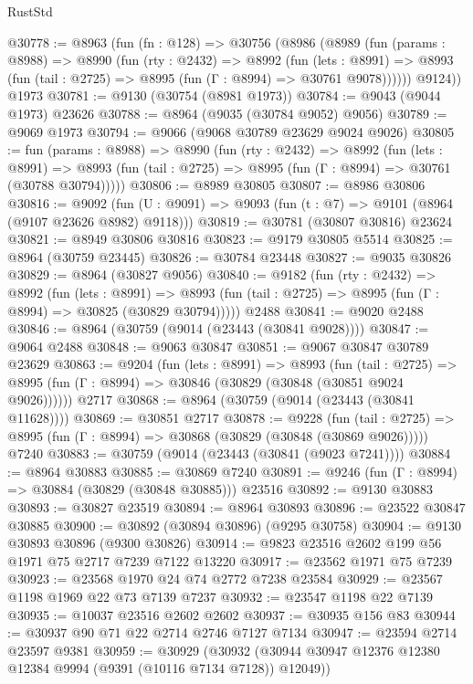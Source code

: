 \begin{lexlean}{RustStd}
\begin{coremodule}
@30778 := @8963
    (fun (fn : @128) =>
    @30756
      (@8986
        (@8989
          (fun (params : @8988) =>
          @8990
            (fun (rty : @2432) =>
            @8992
              (fun (lets : @8991) =>
              @8993 (fun (tail : @2725) => @8995 (fun (Γ : @8994) => @30761 @9078))))))
        @9124))
    @1973
@30781 := @9130 (@30754 (@8981 @1973))
@30784 := @9043 (@9044 @1973) @23626
@30788 := @8964 (@9035 (@30784 @9052) @9056)
@30789 := @9069 @1973
@30794 := @9066 (@9068 @30789 @23629 @9024 @9026)
@30805 := fun (params : @8988) =>
  @8990
    (fun (rty : @2432) =>
    @8992
      (fun (lets : @8991) =>
      @8993 (fun (tail : @2725) => @8995 (fun (Γ : @8994) => @30761 (@30788 @30794)))))
@30806 := @8989 @30805
@30807 := @8986 @30806
@30816 := @9092
    (fun (U : @9091) => @9093 (fun (t : @7) => @9101 (@8964 (@9107 @23626 @8982) @9118)))
@30819 := @30781 (@30807 @30816) @23624
@30821 := @8949 @30806 @30816
@30823 := @9179 @30805 @5514
@30825 := @8964 (@30759 @23445)
@30826 := @30784 @23448
@30827 := @9035 @30826
@30829 := @8964 (@30827 @9056)
@30840 := @9182
    (fun (rty : @2432) =>
    @8992
      (fun (lets : @8991) =>
      @8993 (fun (tail : @2725) => @8995 (fun (Γ : @8994) => @30825 (@30829 @30794)))))
    @2488
@30841 := @9020 @2488
@30846 := @8964 (@30759 (@9014 (@23443 (@30841 @9028))))
@30847 := @9064 @2488
@30848 := @9063 @30847
@30851 := @9067 @30847 @30789 @23629
@30863 := @9204
    (fun (lets : @8991) =>
    @8993
      (fun (tail : @2725) =>
      @8995 (fun (Γ : @8994) => @30846 (@30829 (@30848 (@30851 @9024 @9026))))))
    @2717
@30868 := @8964 (@30759 (@9014 (@23443 (@30841 @11628))))
@30869 := @30851 @2717
@30878 := @9228
    (fun (tail : @2725) => @8995 (fun (Γ : @8994) => @30868 (@30829 (@30848 (@30869 @9026)))))
    @7240
@30883 := @30759 (@9014 (@23443 (@30841 (@9023 @7241))))
@30884 := @8964 @30883
@30885 := @30869 @7240
@30891 := @9246 (fun (Γ : @8994) => @30884 (@30829 (@30848 @30885))) @23516
@30892 := @9130 @30883
@30893 := @30827 @23519
@30894 := @8964 @30893
@30896 := @23522 @30847 @30885
@30900 := @30892 (@30894 @30896) (@9295 @30758)
@30904 := @9130 @30893 @30896 (@9300 @30826)
@30914 := @9823 @23516 @2602 @199 @56 @1971 @75 @2717 @7239 @7122 @13220
@30917 := @23562 @1971 @75 @7239
@30923 := @23568 @1970 @24 @74 @2772 @7238 @23584
@30929 := @23567 @1198 @1969 @22 @73 @7139 @7237
@30932 := @23547 @1198 @22 @7139
@30935 := @10037 @23516 @2602 @2602
@30937 := @30935 @156 @83
@30944 := @30937 @90 @71 @22 @2714 @2746 @7127 @7134
@30947 := @23594 @2714 @23597 @9381
@30959 := @30929
    (@30932 (@30944 @30947 @12376 @12380 @12384 @9994 (@9391 (@10116 @7134 @7128)) @12049))

\end{coremodule}
\end{lexlean}
